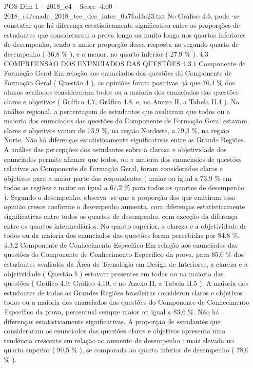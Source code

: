 \begin{textsample}{POS Dim 1 – 2018\_c4 – Score -4.00 – 2018\_c4/enade\_2018\_tec\_des\_inter\_0a7fad3a23.txt}
No Gráfico 4.6, pode -se constatar que há diferença estatisticamente significativa entre as proporções de estudantes que consideraram a prova longa ou muito longa nos quartos inferiores de desempenho, sendo a maior proporção dessa resposta no segundo quarto de desempenho ( 36,8 \% ), e a menor, no quarto inferior ( 27,9 \% ). 4.3 COMPREENSÃO DOS ENUNCIADOS DAS QUESTÕES 4.3.1 Componente de Formação Geral Em relação aos enunciados das questões do Componente de Formação Geral ( Questão 4 ), as opiniões foram positivas, já que 76,4 \% dos alunos avaliados consideraram todos ou a maioria dos enunciados das questões claros e objetivos ( Gráfico 4.7, Gráfico 4.8, e, no Anexo II, a Tabela II.4 ).
Na análise regional, a percentagem de estudantes que avaliaram que todos ou a maioria dos enunciados das questões do Componente de Formação Geral estavam claros e objetivos variou de 73,9 \%, na região Nordeste, a 79,3 \%, na região Norte.
Não há diferenças estatisticamente significativas entre as Grande Regiões.
A análise das percepções dos estudantes sobre a clareza e objetividade dos enunciados permite afirmar que todos, ou a maioria dos enunciados de questões relativas ao Componente de Formação Geral, foram considerados claros e objetivos para a maior parte dos respondentes ( maior ou igual a 73,9 \% em todas as regiões e maior ou igual a 67,2 \% para todos os quartos de desempenho ).
Segundo o desempenho, observa -se que a proporção dos que emitiram essa opinião cresce conforme o desempenho aumenta, com diferenças estatisticamente significativas entre todos os quartos de desempenho, com exceção da diferença entre os quartos intermediários.
No quarto superior, a clareza e a objetividade de todos ou da maioria dos enunciados das questões foram percebidas por 84,8 \%. 4.3.2 Componente de Conhecimento Específico Em relação aos enunciados das questões do Componente de Conhecimento Específico da prova, para 85,0 \% dos estudantes avaliados da Área de Tecnologia em Design de Interiores, a clareza e a objetividade ( Questão 5 ) estavam presentes em todas ou na maioria das questões ( Gráfico 4.9, Gráfico 4.10, e no Anexo II, a Tabela II.5 ).
A maioria dos estudantes de todas as Grandes Regiões brasileiras considerou claros e objetivos todos ou a maioria dos enunciados das questões do Componente de Conhecimento Específico da prova, percentual sempre maior ou igual a 83,6 \%.
Não há diferenças estatisticamente significativas.
A proporção de estudantes que consideraram os enunciados das questões claros e objetivos apresenta uma tendência crescente em relação ao aumento de desempenho : mais elevada no quarto superior ( 90,5 \% ), se comparada ao quarto inferior de desempenho ( 78,0 \% ).

\end{textsample}
